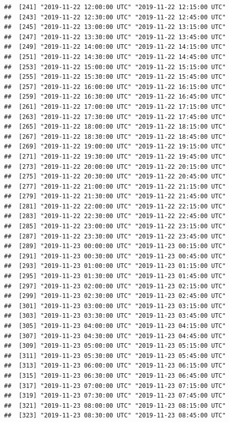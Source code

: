 \documentclass{article}\usepackage[]{graphicx}\usepackage[]{color}
\makeatletter
\newenvironment{kframe}{%
 \def\at@end@of@kframe{}%
 \ifinner\ifhmode%
  \def\at@end@of@kframe{\end{minipage}}%
  \begin{minipage}{\columnwidth}%
 \fi\fi%
 \def\FrameCommand##1{\hskip\@totalleftmargin \hskip-\fboxsep
 \colorbox{shadecolor}{##1}\hskip-\fboxsep
     \hskip-\linewidth \hskip-\@totalleftmargin \hskip\columnwidth}%
 \MakeFramed {\advance\hsize-\width
   \@totalleftmargin\z@ \linewidth\hsize
   \@setminipage}}%
 {\par\unskip\endMakeFramed%
 \at@end@of@kframe}
\newenvironment{knitrout}{}{} %
\makeatother
\begin{document}
\begin{knitrout}
\begin{kframe}
\begin{verbatim}
##  [241] "2019-11-22 12:00:00 UTC" "2019-11-22 12:15:00 UTC"
##  [243] "2019-11-22 12:30:00 UTC" "2019-11-22 12:45:00 UTC"
##  [245] "2019-11-22 13:00:00 UTC" "2019-11-22 13:15:00 UTC"
##  [247] "2019-11-22 13:30:00 UTC" "2019-11-22 13:45:00 UTC"
##  [249] "2019-11-22 14:00:00 UTC" "2019-11-22 14:15:00 UTC"
##  [251] "2019-11-22 14:30:00 UTC" "2019-11-22 14:45:00 UTC"
##  [253] "2019-11-22 15:00:00 UTC" "2019-11-22 15:15:00 UTC"
##  [255] "2019-11-22 15:30:00 UTC" "2019-11-22 15:45:00 UTC"
##  [257] "2019-11-22 16:00:00 UTC" "2019-11-22 16:15:00 UTC"
##  [259] "2019-11-22 16:30:00 UTC" "2019-11-22 16:45:00 UTC"
##  [261] "2019-11-22 17:00:00 UTC" "2019-11-22 17:15:00 UTC"
##  [263] "2019-11-22 17:30:00 UTC" "2019-11-22 17:45:00 UTC"
##  [265] "2019-11-22 18:00:00 UTC" "2019-11-22 18:15:00 UTC"
##  [267] "2019-11-22 18:30:00 UTC" "2019-11-22 18:45:00 UTC"
##  [269] "2019-11-22 19:00:00 UTC" "2019-11-22 19:15:00 UTC"
##  [271] "2019-11-22 19:30:00 UTC" "2019-11-22 19:45:00 UTC"
##  [273] "2019-11-22 20:00:00 UTC" "2019-11-22 20:15:00 UTC"
##  [275] "2019-11-22 20:30:00 UTC" "2019-11-22 20:45:00 UTC"
##  [277] "2019-11-22 21:00:00 UTC" "2019-11-22 21:15:00 UTC"
##  [279] "2019-11-22 21:30:00 UTC" "2019-11-22 21:45:00 UTC"
##  [281] "2019-11-22 22:00:00 UTC" "2019-11-22 22:15:00 UTC"
##  [283] "2019-11-22 22:30:00 UTC" "2019-11-22 22:45:00 UTC"
##  [285] "2019-11-22 23:00:00 UTC" "2019-11-22 23:15:00 UTC"
##  [287] "2019-11-22 23:30:00 UTC" "2019-11-22 23:45:00 UTC"
##  [289] "2019-11-23 00:00:00 UTC" "2019-11-23 00:15:00 UTC"
##  [291] "2019-11-23 00:30:00 UTC" "2019-11-23 00:45:00 UTC"
##  [293] "2019-11-23 01:00:00 UTC" "2019-11-23 01:15:00 UTC"
##  [295] "2019-11-23 01:30:00 UTC" "2019-11-23 01:45:00 UTC"
##  [297] "2019-11-23 02:00:00 UTC" "2019-11-23 02:15:00 UTC"
##  [299] "2019-11-23 02:30:00 UTC" "2019-11-23 02:45:00 UTC"
##  [301] "2019-11-23 03:00:00 UTC" "2019-11-23 03:15:00 UTC"
##  [303] "2019-11-23 03:30:00 UTC" "2019-11-23 03:45:00 UTC"
##  [305] "2019-11-23 04:00:00 UTC" "2019-11-23 04:15:00 UTC"
##  [307] "2019-11-23 04:30:00 UTC" "2019-11-23 04:45:00 UTC"
##  [309] "2019-11-23 05:00:00 UTC" "2019-11-23 05:15:00 UTC"
##  [311] "2019-11-23 05:30:00 UTC" "2019-11-23 05:45:00 UTC"
##  [313] "2019-11-23 06:00:00 UTC" "2019-11-23 06:15:00 UTC"
##  [315] "2019-11-23 06:30:00 UTC" "2019-11-23 06:45:00 UTC"
##  [317] "2019-11-23 07:00:00 UTC" "2019-11-23 07:15:00 UTC"
##  [319] "2019-11-23 07:30:00 UTC" "2019-11-23 07:45:00 UTC"
##  [321] "2019-11-23 08:00:00 UTC" "2019-11-23 08:15:00 UTC"
##  [323] "2019-11-23 08:30:00 UTC" "2019-11-23 08:45:00 UTC"

\end{verbatim}
\end{kframe}
\end{knitrout}
\end{document}
